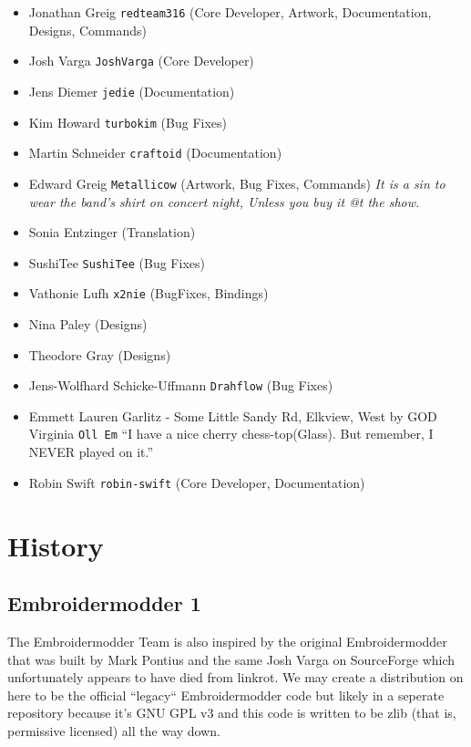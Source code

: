 \documentclass[11pt]{report}
\begin{document}
\begin{itemize}
\item Jonathan Greig \texttt{redteam316} (Core Developer, Artwork, Documentation, Designs, Commands)
\item Josh Varga \texttt{JoshVarga} (Core Developer)
\item Jens Diemer \texttt{jedie} (Documentation)
\item Kim Howard \texttt{turbokim} (Bug Fixes)
\item Martin Schneider \texttt{craftoid} (Documentation)
\item Edward Greig \texttt{Metallicow} (Artwork, Bug Fixes, Commands)
    \emph{It is a sin to wear the band's shirt on concert night, Unless you buy it @t the show.}
\item Sonia Entzinger (Translation)
\item SushiTee \texttt{SushiTee} (Bug Fixes)
\item Vathonie Lufh \texttt{x2nie} (BugFixes, Bindings)
\item Nina Paley (Designs)
\item Theodore Gray (Designs)
\item Jens-Wolfhard Schicke-Uffmann \texttt{Drahflow} (Bug Fixes)
\item Emmett Lauren Garlitz - Some Little Sandy Rd, Elkview, West by GOD Virginia \texttt{Oll Em}
    ``I have a nice cherry chess-top(Glass). But remember, I NEVER played on it.''
\item Robin Swift \texttt{robin-swift} (Core Developer, Documentation)
\end{itemize}

\section{History}

\subsection{Embroidermodder 1}

The Embroidermodder Team is also inspired by the original Embroidermodder that
was built by Mark Pontius and the same Josh Varga on SourceForge which
unfortunately appears to have died from linkrot. We may create a distribution
on here to be the official ``legacy`` Embroidermodder code but likely in a
seperate repository because it's GNU GPL v3 and this code is written to be
zlib (that is, permissive licensed) all the way down.
\end{document}
